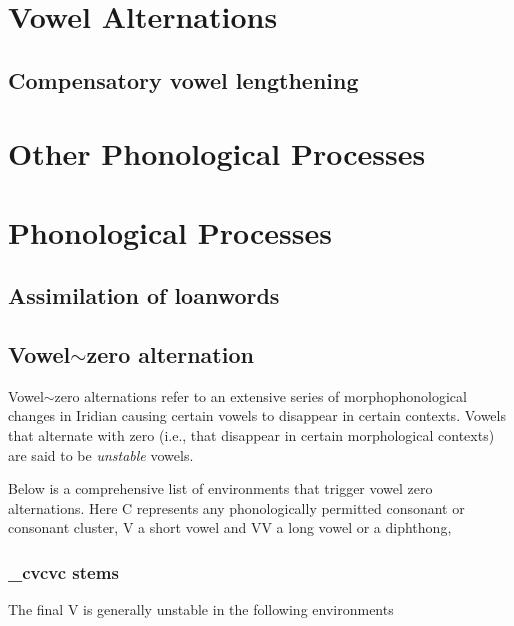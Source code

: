 \section{Vowel Alternations}

\subsection{Compensatory vowel lengthening}

\section{Other Phonological Processes}


\section{Phonological Processes}

\subsection{Assimilation of loanwords}


\subsection{Vowel$\sim$zero alternation}

Vowel$\sim$zero alternations refer to an extensive series of morphophonological changes in Iridian causing certain vowels to disappear in certain contexts. Vowels that alternate with zero (i.e., that disappear in certain morphological contexts) are said to be \textit{unstable} vowels.

\par Below is a comprehensive list of environments that trigger vowel zero alternations. Here C represents any phonologically permitted consonant or consonant cluster, V a short vowel and VV a long vowel or a diphthong,

\subsubsection{\_cvcvc stems}
The final V is generally unstable in the following environments

